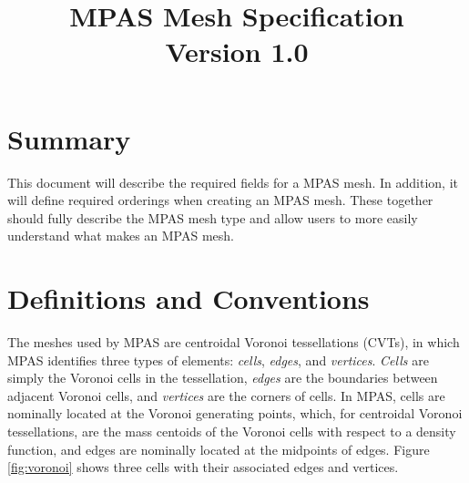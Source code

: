 \documentclass[11pt]{report}
\begin{document}
\title{MPAS Mesh Specification \\ Version 1.0}

\maketitle
\tableofcontents


\chapter{Summary}


This document will describe the required fields for a MPAS mesh. In addition, it
will define required orderings when creating an MPAS mesh. These together
should fully describe the MPAS mesh type and allow users to more easily
understand what makes an MPAS mesh.


\chapter{Definitions and Conventions}

The meshes used by MPAS are centroidal Voronoi tessellations (CVTs), in which MPAS identifies three types of 
elements: {\it cells}, {\it edges}, and {\it vertices}. {\it Cells} are simply the Voronoi cells in the tessellation, {\it edges} are the boundaries
between adjacent Voronoi cells, and {\it vertices} are the corners of cells. In MPAS, cells are nominally located at the Voronoi generating points, which, for centroidal Voronoi tessellations, are the mass centoids of the Voronoi cells with respect to a density function, and edges are nominally located at the midpoints of edges. Figure \ref{fig:voronoi} shows three cells with their associated edges and vertices.
\end{document}
